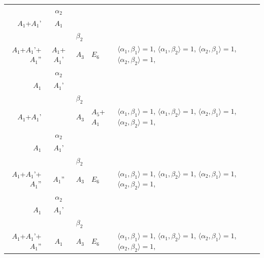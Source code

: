 \documentclass[12pt]{report}
\begin{document}
\begin{appendix}
{\begin{longtable}{rcl p{1cm}p{1cm}p{3cm} }
\\
\begin{tabular}{cc}$\alpha_1$+ & $\alpha_2$\\\tiny{ $A_1$+$A_1$' } & \tiny{ $A_1$ }\end{tabular} &\begin{tabular}{c} = \\~ \end{tabular} & \begin{tabular}{cc}$\beta_1$+ & $\beta_2$\\\tiny{ $A_1$+$A_1$'+$A_1$'' } & \tiny{ $A_1$+$A_1$' }\end{tabular} & $A_3$ & $E_6$ &  $\langle\alpha_1, \beta_1\rangle=1$, $\langle\alpha_1, \beta_2\rangle=1$, $\langle\alpha_2, \beta_1\rangle=1$, $\langle\alpha_2, \beta_2\rangle=1$, 
\\
\begin{tabular}{cc}$\alpha_1$+ & $\alpha_2$\\\tiny{ $A_1$ } & \tiny{ $A_1$' }\end{tabular} &\begin{tabular}{c} = \\~ \end{tabular} & \begin{tabular}{cc}$\beta_1$+ & $\beta_2$\\\tiny{ $A_1$+$A_1$' } & \tiny{  }\end{tabular} & $A_3$ & $A_5$+$A_1$ &  $\langle\alpha_1, \beta_1\rangle=1$, $\langle\alpha_1, \beta_2\rangle=1$, $\langle\alpha_2, \beta_1\rangle=1$, $\langle\alpha_2, \beta_2\rangle=1$, 
\\
\begin{tabular}{cc}$\alpha_1$+ & $\alpha_2$\\\tiny{ $A_1$ } & \tiny{ $A_1$' }\end{tabular} &\begin{tabular}{c} = \\~ \end{tabular} & \begin{tabular}{cc}$\beta_1$+ & $\beta_2$\\\tiny{ $A_1$+$A_1$'+$A_1$'' } & \tiny{ $A_1$'' }\end{tabular} & $A_3$ & $E_6$ &  $\langle\alpha_1, \beta_1\rangle=1$, $\langle\alpha_1, \beta_2\rangle=1$, $\langle\alpha_2, \beta_1\rangle=1$, $\langle\alpha_2, \beta_2\rangle=1$, 
\\
\begin{tabular}{cc}$\alpha_1$+ & $\alpha_2$\\\tiny{ $A_1$ } & \tiny{ $A_1$' }\end{tabular} &\begin{tabular}{c} = \\~ \end{tabular} & \begin{tabular}{cc}$\beta_1$+ & $\beta_2$\\\tiny{ $A_1$+$A_1$'+$A_1$'' } & \tiny{ $A_1$ }\end{tabular} & $A_3$ & $E_6$ &  $\langle\alpha_1, \beta_1\rangle=1$, $\langle\alpha_1, \beta_2\rangle=1$, $\langle\alpha_2, \beta_1\rangle=1$, $\langle\alpha_2, \beta_2\rangle=1$, 

\end{longtable}}
\end{appendix}
\end{document}
